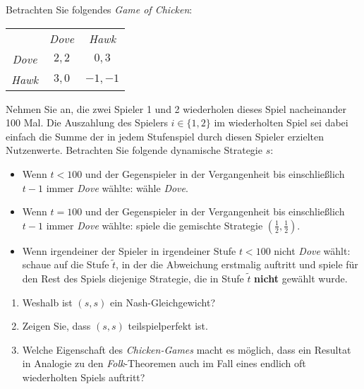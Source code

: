 Betrachten Sie folgendes \emph{Game of Chicken}:
\begin{center}
  \begin{tabular}{ccc}
    & \emph{Dove} & \emph{Hawk}\\
    \cmidrule{2-3}
    \emph{Dove} & $2,2$ & $0,3$\\
    \cmidrule{2-3}
    \emph{Hawk} & $3,0$ & $-1,-1$\\
    \cmidrule{2-3}
  \end{tabular}
\end{center}
Nehmen Sie an, die zwei Spieler 1 und 2 wiederholen dieses Spiel nacheinander 100 Mal.
Die Auszahlung des Spielers $i \in \{1,2\}$ im wiederholten Spiel sei dabei einfach die
Summe der in jedem Stufenspiel durch diesen Spieler erzielten Nutzenwerte.
Betrachten Sie folgende dynamische Strategie $s$:
\begin{itemize}
  \item Wenn $t < 100$ und der Gegenspieler in der Vergangenheit bis einschließlich $t-1$
    immer \emph{Dove} wählte: wähle \emph{Dove}.
  \item Wenn $t = 100$ und der Gegenspieler in der Vergangenheit bis einschließlich $t-1$
    immer \emph{Dove} wählte: spiele die gemischte Strategie
    $\left( \frac{1}{2}, \frac{1}{2} \right)$.
  \item Wenn irgendeiner der Spieler in irgendeiner Stufe $t < 100$ nicht \emph{Dove}
    wählt: schaue auf die Stufe $\tilde{t}$, in der die Abweichung erstmalig auftritt und
    spiele für den Rest des Spiels diejenige Strategie, die in Stufe $\tilde{t}$
    \textbf{nicht} gewählt wurde.
\end{itemize}

\begin{enumerate}
  \item Weshalb ist $(s,s)$ ein Nash-Gleichgewicht?
  \item Zeigen Sie, dass $(s,s)$ teilspielperfekt ist.
  \item Welche Eigenschaft des \emph{Chicken-Games} macht es möglich, dass ein Resultat in
    Analogie zu den \emph{Folk}-Theoremen auch im Fall eines endlich oft wiederholten
    Spiels auftritt?
\end{enumerate}
